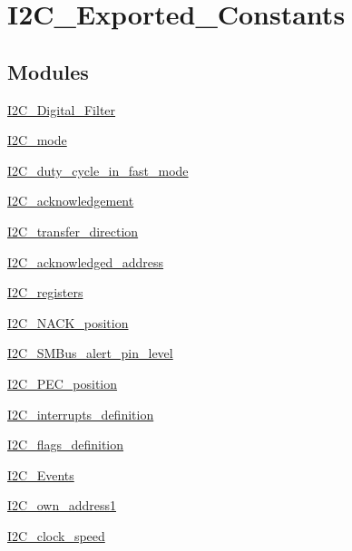 \hypertarget{group___i2_c___exported___constants}{}\section{I2\+C\+\_\+\+Exported\+\_\+\+Constants}
\label{group___i2_c___exported___constants}
\subsection*{Modules}
\begin{DoxyCompactItemize}
\item 
\mbox{\hyperlink{group___i2_c___digital___filter}{I2\+C\+\_\+\+Digital\+\_\+\+Filter}}
\item 
\mbox{\hyperlink{group___i2_c__mode}{I2\+C\+\_\+mode}}
\item 
\mbox{\hyperlink{group___i2_c__duty__cycle__in__fast__mode}{I2\+C\+\_\+duty\+\_\+cycle\+\_\+in\+\_\+fast\+\_\+mode}}
\item 
\mbox{\hyperlink{group___i2_c__acknowledgement}{I2\+C\+\_\+acknowledgement}}
\item 
\mbox{\hyperlink{group___i2_c__transfer__direction}{I2\+C\+\_\+transfer\+\_\+direction}}
\item 
\mbox{\hyperlink{group___i2_c__acknowledged__address}{I2\+C\+\_\+acknowledged\+\_\+address}}
\item 
\mbox{\hyperlink{group___i2_c__registers}{I2\+C\+\_\+registers}}
\item 
\mbox{\hyperlink{group___i2_c___n_a_c_k__position}{I2\+C\+\_\+\+N\+A\+C\+K\+\_\+position}}
\item 
\mbox{\hyperlink{group___i2_c___s_m_bus__alert__pin__level}{I2\+C\+\_\+\+S\+M\+Bus\+\_\+alert\+\_\+pin\+\_\+level}}
\item 
\mbox{\hyperlink{group___i2_c___p_e_c__position}{I2\+C\+\_\+\+P\+E\+C\+\_\+position}}
\item 
\mbox{\hyperlink{group___i2_c__interrupts__definition}{I2\+C\+\_\+interrupts\+\_\+definition}}
\item 
\mbox{\hyperlink{group___i2_c__flags__definition}{I2\+C\+\_\+flags\+\_\+definition}}
\item 
\mbox{\hyperlink{group___i2_c___events}{I2\+C\+\_\+\+Events}}
\item 
\mbox{\hyperlink{group___i2_c__own__address1}{I2\+C\+\_\+own\+\_\+address1}}
\item 
\mbox{\hyperlink{group___i2_c__clock__speed}{I2\+C\+\_\+clock\+\_\+speed}}
\end{DoxyCompactItemize}
